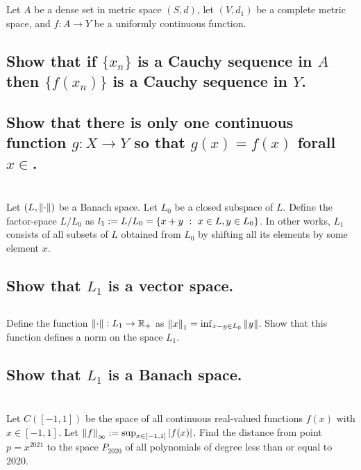 \documentclass[]{article}
\newcommand{\R}{\mathbb{R}}
\newcommand{\st}{\ : \ }
\begin{document}
\newpage
\section{}
Let $A$ be a dense set in metric space $(S,d)$, let $(V,d_1)$ be a complete metric space, and $f : A \to Y$ be a uniformly continuous function. 

\subsection{Show that if $\{x_n\}$ is a Cauchy sequence in $A$ then $\{f(x_n)\}$ is a Cauchy sequence in $Y$.}




\subsection{Show that there is only one continuous function $g : X \to Y$ so that $g(x) = f(x)$ forall $x \in $.}














\newpage
\section{}
Let $(L, \norm{\cdot})$ be a Banach space. 
Let $L_0$ be a closed subspace of $L$. 
Define the factor-space $L/L_0$ as $l_1 := L/L_0 = \qty{x + y \st x \in L, y \in L_0}$. 
In other works, $L_1$ consists of all subsets of $L$ obtained from $L_0$ by shifting all its elements by some element $x$. 

\subsection{Show that $L_1$ is a vector space.}


\subsection{}
Define the function $\norm{\cdot} : L_1 \to \R_{+}$ as $\norm{x}_1 = \inf_{x - y \in L_0} \norm{y}$. 
Show that this function defines a norm on the space $L_1$.


\subsection{Show that $L_1$ is a Banach space.}







\newpage
\section{}
Let $C([-1,1])$ be the space of all continuous real-valued functions $f(x)$ with $x \in [-1,1]$. 
Let $\norm{f}_\infty := \sup_{x \in [-1,1]} \abs{f(x)}$. 
Find the distance from point $p = x^{2021}$ to the space $P_{2020}$ of all polynomials of degree less than or equal to 2020.
\end{document}
